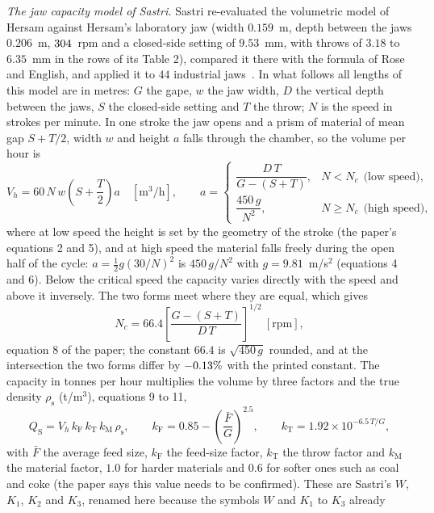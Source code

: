 \emph{The jaw capacity model of Sastri.} Sastri re-evaluated the volumetric model of Hersam against Hersam's laboratory jaw (width $0.159$~m, depth between the jaws $0.206$~m, $304$~rpm and a closed-side setting of $9.53$~mm, with throws of $3.18$ to $6.35$~mm in the rows of its Table 2), compared it there with the formula of Rose and English, and applied it to $44$ industrial jaws~\cite{sastri1994}. In what follows all lengths of this model are in metres: $G$ the gape, $w$ the jaw width,
$D$ the vertical depth between the jaws, $S$ the closed-side setting and $T$ the throw; $N$ is the speed in strokes per minute. In one stroke the jaw opens and a prism of material of mean gap $S+T/2$, width $w$ and height $a$ falls through the chamber, so the volume per hour is
\begin{equation}
V_h=60\,N\,w\left(S+\frac{T}{2}\right)a\quad[\mathrm{m^3/h}],\qquad
a=\begin{cases}\dfrac{D\,T}{G-(S+T)}, & N<N_c\ \ \text{(low speed)},\\[8pt]\dfrac{450\,g}{N^2}, & N\ge N_c\ \ \text{(high speed)},\end{cases}
\label{eq:sastri-vh}
\end{equation}
where at low speed the height is set by the geometry of the stroke (the paper's equations 2 and 5), and at high speed the material falls freely during the open half of the cycle: $a=\tfrac12 g(30/N)^2$ is $450\,g/N^2$ with $g=9.81$~m/s$^2$ (equations 4 and 6). Below the critical speed the capacity varies directly with the speed and above it inversely. The two forms meet where they are equal, which gives
\begin{equation}
N_c=66.4\left[\frac{G-(S+T)}{D\,T}\right]^{1/2}\ [\mathrm{rpm}],
\label{eq:sastri-nc}
\end{equation}
equation 8 of the paper; the constant $66.4$ is $\sqrt{450\,g}$ rounded, and at the intersection the two forms differ by $-0.13\%$ with the printed constant. The capacity in tonnes per hour multiplies the volume by three factors and the true density $\rho_{\mathrm s}$ (t/m$^3$), equations 9 to 11,
\begin{equation}
Q_{\mathrm S}=V_h\,k_{\mathrm F}\,k_{\mathrm T}\,k_{\mathrm M}\,\rho_{\mathrm s},\qquad
k_{\mathrm F}=0.85-\left(\frac{\bar F}{G}\right)^{2.5},\qquad
k_{\mathrm T}=1.92\times10^{-6.5\,T/G},
\label{eq:sastri-q}
\end{equation}
with $\bar F$ the average feed size, $k_{\mathrm F}$ the feed-size factor, $k_{\mathrm T}$ the throw factor and $k_{\mathrm M}$ the material factor, $1.0$ for harder materials and $0.6$ for softer ones such as coal and coke (the paper says this value needs to be confirmed). These are Sastri's $W$, $K_1$, $K_2$ and $K_3$, renamed here because the symbols $W$ and $K_1$ to $K_3$ already
